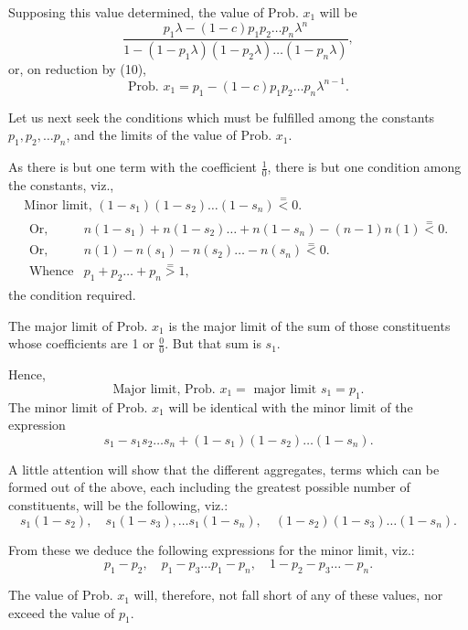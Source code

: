 \documentclass[oneside]{book}
\begin{document}
Supposing this value determined, the value of Prob. $x_1$ will be
\[
  \frac{p_1\lambda - (1-c)p_1p_2 \dotsc p_n\lambda^n}
       {1 - (1-p_1\lambda)(1-p_2\lambda)\dotsc (1-p_n\lambda)},
\]
or, on reduction by (10),
\[
  \text{Prob. }x_1 = p_1 - (1-c)p_1p_2 \dotsc p_n \lambda^{n-1}. \tag{11}
\]

Let us next seek the conditions which must be fulfilled
among the constants $p_1, p_2, \dotsc p_n$, and the limits of the value of
Prob. $x_1$.

As there is but one term with the coefficient $\frac{1}{0}$, there is but
one condition among the constants, viz.,
\begin{gather*}
  \text{Minor limit, }(1-s_1)(1-s_2) \dotsc (1-s_n)
    \stackrel{=}{<} 0.  \\
 \begin{array}{lc}
  \text{Or,} &
    n(1-s_1) + n(1-s_2) \dotsc + n(1-s_n) - (n-1)n(1)
    \stackrel{=}{<} 0. \\
  \text{Or,} & n(1) - n(s_1) - n(s_2) \dotsc - n(s_n)
    \stackrel{=}{<} 0. \\
  \text{Whence} & p_1 + p_2 \dotsc + p_n
    \stackrel{=}{>} 1,
 \end{array}
\end{gather*}
the condition required.

The major limit of Prob. $x_1$ is the major limit of the sum of
those constituents whose coefficients are 1 or $\frac{0}{0}$. But that sum is $s_1$.

Hence,
\[
  \text{Major limit, Prob. }x_1 = \text{ major limit }s_1 = p_1.
\]
The minor limit of Prob. $x_1$ will be identical with the minor
limit of the expression
\[
  s_1 - s_1 s_2 \dotsc s_n + (1 -s_1)(1 - s_2)\dotsc (1 - s_n).
\]

A little attention will show that the different aggregates,
terms which can be formed out of the above, each including the
greatest possible number of constituents, will be the following,
viz.:
\[
  s_1(1-s_2),\quad s_1(1 - s_3), \dotsc s_1(1 - s_n),\quad
  (1 - s_2)(1 - s_3) \dotsc (1 - s_n).
\]

From these we deduce the following expressions for the minor
limit, viz.:
\[
  p_1 - p_2,\quad  p_1 - p_3 \dotsc p_1 - p_n,\quad
  1 - p_2 - p_3 \dotsc - p_n .
\]

The value of Prob. $x_1$ will, therefore, not fall short of any of
these values, nor exceed the value of $p_1$.
\end{document}
